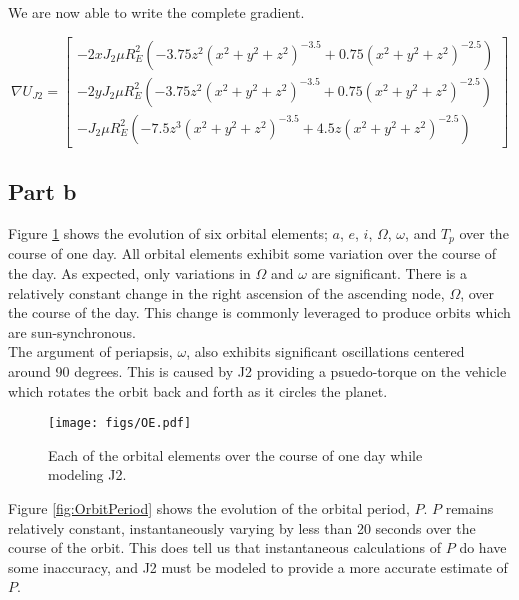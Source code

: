 \documentclass[11pt]{article}
\begin{document}
We are now able to write the complete gradient.

\begin{equation}
	\nabla U_{J2} = \begin{bmatrix}
	- 2 x J_2 \mu R_E^2 \left( -3.75 z^2 \left( x^2 + y^2 + z^2\right)^{-3.5} + 0.75 \left( x^2 + y^2 + z^2\right)^{-2.5} \right) \\
	- 2 y J_2 \mu R_E^2 \left( -3.75 z^2 \left( x^2 + y^2 + z^2\right)^{-3.5} + 0.75 \left( x^2 + y^2 + z^2\right)^{-2.5} \right) \\
	- J_2 \mu R_E^2 \left(  -7.5 z^3 \left( x^2 + y^2 + z^2\right)^{-3.5} + 4.5z\left( x^2 + y^2 + z^2\right)^{-2.5} \right)
	\end{bmatrix}
\end{equation}

\subsection{Part b}

Figure \ref{fig:OE} shows the evolution of six orbital elements; $a$, $e$, $i$, $\Omega$, $\omega$, and $T_p$ over the course of one day. All orbital elements exhibit some variation over the course of the day. As expected, only variations in $\Omega$ and $\omega$ are significant. There is a relatively constant change in the right ascension of the ascending node, $\Omega$, over the course of the day. This change is commonly leveraged to produce orbits which are sun-synchronous. \\

The argument of periapsis, $\omega$, also exhibits significant oscillations centered around 90 degrees. This is caused by J2 providing a psuedo-torque on the vehicle which rotates the orbit back and forth as it circles the planet. \\

\begin{figure}[h!]
	\centering
	\texttt{[image: figs/OE.pdf]}
	\caption{Each of the orbital elements over the course of one day while modeling J2.}
	\label{fig:OE}
\end{figure}

Figure \ref{fig:OrbitPeriod} shows the evolution of the orbital period, $P$. $P$ remains relatively constant, instantaneously varying by less than 20 seconds over the course of the orbit. This does tell us that instantaneous calculations of $P$ do have some inaccuracy, and J2 must be modeled to provide a more accurate estimate of $P$. \\
\end{document}
